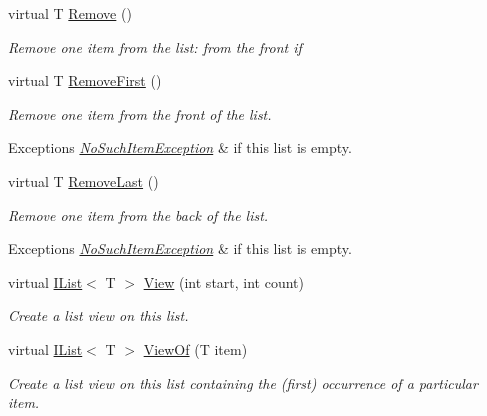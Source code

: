 \begin{DoxyCompactItemize}
virtual T \hyperlink{class_c5_1_1_hashed_linked_list_a899849bf8ad50e60206c8b3b59611eaf}{Remove} ()
\begin{DoxyCompactList}\small\item\em Remove one item from the list\+: from the front if \end{DoxyCompactList}\item 
virtual T \hyperlink{class_c5_1_1_hashed_linked_list_ab319b375d54035e9599a018ea4c6f342}{Remove\+First} ()
\begin{DoxyCompactList}\small\item\em Remove one item from the front of the list. 
\begin{DoxyExceptions}{Exceptions}
{\em \hyperlink{class_c5_1_1_no_such_item_exception}{No\+Such\+Item\+Exception}} & if this list is empty. \\
\hline
\end{DoxyExceptions}
\end{DoxyCompactList}\item 
virtual T \hyperlink{class_c5_1_1_hashed_linked_list_a0fc592e8e1c3667b8e65f3b32eafe863}{Remove\+Last} ()
\begin{DoxyCompactList}\small\item\em Remove one item from the back of the list. 
\begin{DoxyExceptions}{Exceptions}
{\em \hyperlink{class_c5_1_1_no_such_item_exception}{No\+Such\+Item\+Exception}} & if this list is empty. \\
\hline
\end{DoxyExceptions}
\end{DoxyCompactList}\item 
virtual \hyperlink{interface_c5_1_1_i_list}{I\+List}$<$ T $>$ \hyperlink{class_c5_1_1_hashed_linked_list_a3a8fd36d2556ffdec212c2b5ab5dc8ab}{View} (int start, int count)
\begin{DoxyCompactList}\small\item\em Create a list view on this list. \end{DoxyCompactList}\item 
virtual \hyperlink{interface_c5_1_1_i_list}{I\+List}$<$ T $>$ \hyperlink{class_c5_1_1_hashed_linked_list_a7ef47c4c75f39782f7f846dadf892f20}{View\+Of} (T item)
\begin{DoxyCompactList}\small\item\em Create a list view on this list containing the (first) occurrence of a particular item. \end{DoxyCompactList}\item 

\end{DoxyCompactItemize}
